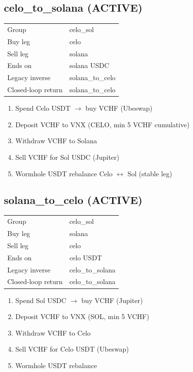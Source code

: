 \documentclass[11pt,a4paper]{article}
\begin{document}
\subsection*{\textcolor{okgreen}{celo\_to\_solana} (ACTIVE)}
\begin{tabular}{@{}ll@{}}
Group & celo\_sol \\
Buy leg & celo \\
Sell leg & solana \\
Ends on & solana USDC \\
Legacy inverse & solana\_to\_celo \\
Closed-loop return & solana\_to\_celo \\
\end{tabular}
\begin{enumerate}[nosep,leftmargin=*]
\item Spend Celo USDT $\rightarrow$ buy VCHF (Ubeswap)
\item Deposit VCHF to VNX (CELO, min 5 VCHF cumulative)
\item Withdraw VCHF to Solana
\item Sell VCHF for Sol USDC (Jupiter)
\item Wormhole USDT rebalance Celo $\leftrightarrow$ Sol (stable leg)
\end{enumerate}
\subsection*{\textcolor{okgreen}{solana\_to\_celo} (ACTIVE)}
\begin{tabular}{@{}ll@{}}
Group & celo\_sol \\
Buy leg & solana \\
Sell leg & celo \\
Ends on & celo USDT \\
Legacy inverse & celo\_to\_solana \\
Closed-loop return & celo\_to\_solana \\
\end{tabular}
\begin{enumerate}[nosep,leftmargin=*]
\item Spend Sol USDC $\rightarrow$ buy VCHF (Jupiter)
\item Deposit VCHF to VNX (SOL, min 5 VCHF)
\item Withdraw VCHF to Celo
\item Sell VCHF for Celo USDT (Ubeswap)
\item Wormhole USDT rebalance
\end{enumerate}
\end{document}
